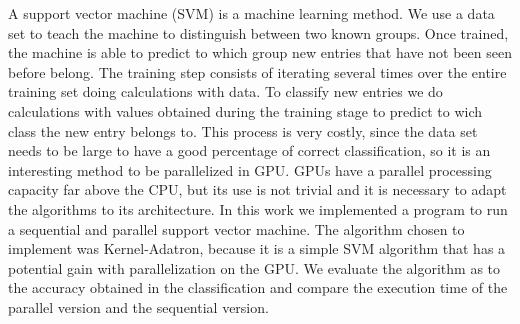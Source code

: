 A support vector machine (SVM) is a machine learning method.
We use a data set to teach the machine to distinguish between two known groups. Once trained, the machine is able to predict to which group new entries that have not been seen before belong.
The training step consists of iterating several times over the entire training set doing calculations with data.
To classify new entries we do calculations with values obtained during the training stage to predict to wich class the new entry belongs to.
This process is very costly, since the data set needs to be large to have a good percentage of correct classification, so it is an interesting method to be parallelized in GPU. GPUs have a parallel processing capacity far above the CPU, but its use is not trivial and it is necessary to adapt the algorithms to its architecture.
In this work we implemented a program to run a sequential and parallel support vector machine. The algorithm chosen to implement was Kernel-Adatron, because it is a simple SVM algorithm that has a potential gain with parallelization on the GPU.
We evaluate the algorithm as to the accuracy obtained in the classification and compare the execution time of the parallel version and the sequential version.